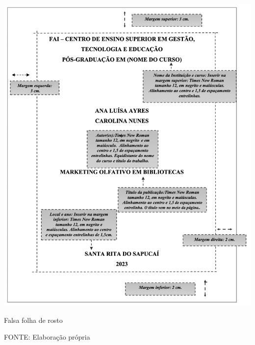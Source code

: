 \begin{figura}[h!]
  \centering
  \addfigura
  \includegraphics[width=1\textwidth]{ilustracoes/figuras/Falsa Folha de Rosto.png}
  \caption{Falsa folha de rosto}
  \vspace{0em}
  \begin{minipage}{\textwidth}
    FONTE: Elaboração própria
  \end{minipage}
  \label{figura:ModeloDeCapaELombada}
\end{figura}